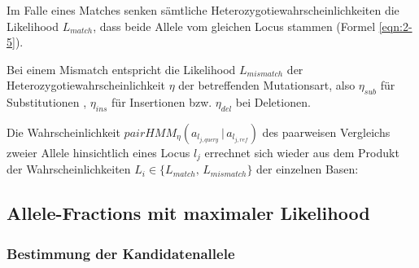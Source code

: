 Im Falle eines Matches senken sämtliche Heterozygotiewahrscheinlichkeiten die Likelihood $L_{match}$, dass beide Allele vom gleichen Locus stammen (Formel \eqref{eqn:2-5}).
\vspace{-0.5cm}
\begin{center}
\end{center}
Bei einem Mismatch entspricht die Likelihood $L_{mismatch}$ der Heterozygotiewahrscheinlichkeit $ \eta $ der betreffenden Mutationsart, also $ \eta_{sub} $ für Substitutionen , $ \eta_{ins} $ für Insertionen bzw. $ \eta_{del} $ bei Deletionen. 
\vspace{-0.5cm}
\begin{center}
\end{center}

Die Wahrscheinlichkeit $ pairHMM_{\eta}(a_{l_{j,query}} \, | \, a_{l_{j,ref}}) $ des  paarweisen Vergleichs zweier Allele hinsichtlich eines Locus $l_{j}$ errechnet sich wieder aus dem Produkt der Wahrscheinlichkeiten $L_{i} \in \{L_{match}, \, L_{mismatch}\}$ der einzelnen Basen:
\vspace{-0.5cm}
\begin{center}
\end{center}

\subsection{Allele-Fractions mit maximaler Likelihood} \label{subsec:sol_allele_lh}
\subsubsection{Bestimmung der Kandidatenallele} \label{subsec:sol_cand_allele}

